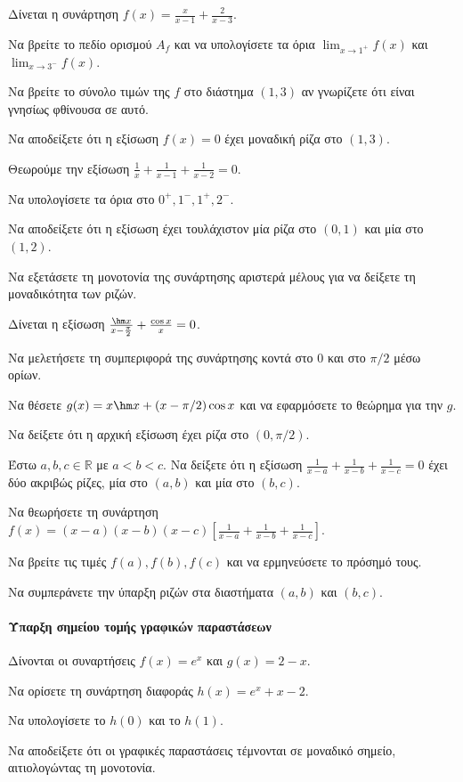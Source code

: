 \documentclass[11pt,a4paper,modern]{FFExercises}
\begin{document}
\askhsh
Δίνεται η συνάρτηση $f(x) = \frac{x}{x-1} + \frac{2}{x-3}$.
\begin{alist}
    \item Να βρείτε το πεδίο ορισμού $A_f$ και να υπολογίσετε τα όρια $\lim_{x\to 1^+}f(x)$ και $\lim_{x\to 3^-}f(x)$.
    \item Να βρείτε το σύνολο τιμών της $f$ στο διάστημα $(1,3)$ αν γνωρίζετε ότι είναι γνησίως φθίνουσα σε αυτό.
    \item Να αποδείξετε ότι η εξίσωση $f(x)=0$ έχει μοναδική ρίζα στο $(1,3)$.
\end{alist}

\askhsh
Θεωρούμε την εξίσωση $\frac{1}{x} + \frac{1}{x-1} + \frac{1}{x-2} = 0$.
\begin{alist}
    \item Να υπολογίσετε τα όρια στο $0^+, 1^-, 1^+, 2^-$.
    \item Να αποδείξετε ότι η εξίσωση έχει τουλάχιστον μία ρίζα στο $(0,1)$ και μία στο $(1,2)$.
    \item Να εξετάσετε τη μονοτονία της συνάρτησης αριστερά μέλους για να δείξετε τη μοναδικότητα των ριζών.
\end{alist}

\askhsh
Δίνεται η εξίσωση $\frac{\hm x}{x-\frac{\pi}{2}} + \frac{\cos x}{x} = 0$.
\begin{alist}
    \item Να μελετήσετε τη συμπεριφορά της συνάρτησης κοντά στο 0 και στο $\pi/2$ μέσω ορίων.
    \item Να θέσετε $g(x) = x \hm x + (x-\pi/2)\cos x$ και να εφαρμόσετε το θεώρημα  για την $g$.
    \item Να δείξετε ότι η αρχική εξίσωση έχει ρίζα στο $(0, \pi/2)$.
\end{alist}

\askhsh
Έστω $a, b, c \in \mathbb{R}$ με $a<b<c$. Να δείξετε ότι η εξίσωση $\frac{1}{x-a} + \frac{1}{x-b} + \frac{1}{x-c} = 0$ έχει δύο ακριβώς ρίζες, μία στο $(a,b)$ και μία στο $(b,c)$.
\begin{alist}
    \item Να θεωρήσετε τη συνάρτηση $f(x)=(x-a)(x-b)(x-c)\left[\frac{1}{x-a} + \frac{1}{x-b} + \frac{1}{x-c}\right]$.
    \item Να βρείτε τις τιμές $f(a), f(b), f(c)$ και να ερμηνεύσετε το πρόσημό τους.
    \item Να συμπεράνετε την ύπαρξη ριζών στα διαστήματα $(a,b)$ και $(b,c)$.
\end{alist}
\paragraph{Ύπαρξη σημείου τομής γραφικών παραστάσεων}
\askhsh
Δίνονται οι συναρτήσεις $f(x)=e^x$ και $g(x)=2-x$.
\begin{alist}
    \item Να ορίσετε τη συνάρτηση διαφοράς $h(x)=e^x+x-2$.
    \item Να υπολογίσετε το $h(0)$ και το $h(1)$.
    \item Να αποδείξετε ότι οι γραφικές παραστάσεις τέμνονται σε μοναδικό σημείο, αιτιολογώντας τη μονοτονία.
\end{alist}
\end{document}
